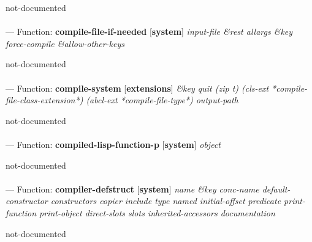 \begin{adjustwidth}{5em}{5em}
not-documented
\end{adjustwidth}

\paragraph{}
\label{SYSTEM:COMPILE-FILE-IF-NEEDED}
--- Function: \textbf{compile-file-if-needed} [\textbf{system}] \textit{input-file \&rest allargs \&key force-compile \&allow-other-keys}

\begin{adjustwidth}{5em}{5em}
not-documented
\end{adjustwidth}

\paragraph{}
\label{EXTENSIONS:COMPILE-SYSTEM}
--- Function: \textbf{compile-system} [\textbf{extensions}] \textit{\&key quit (zip t) (cls-ext *compile-file-class-extension*) (abcl-ext *compile-file-type*) output-path}

\begin{adjustwidth}{5em}{5em}
not-documented
\end{adjustwidth}

\paragraph{}
\label{SYSTEM:COMPILED-LISP-FUNCTION-P}
--- Function: \textbf{compiled-lisp-function-p} [\textbf{system}] \textit{object}

\begin{adjustwidth}{5em}{5em}
not-documented
\end{adjustwidth}

\paragraph{}
\label{SYSTEM:COMPILER-DEFSTRUCT}
--- Function: \textbf{compiler-defstruct} [\textbf{system}] \textit{name \&key conc-name default-constructor constructors copier include type named initial-offset predicate print-function print-object direct-slots slots inherited-accessors documentation}

\begin{adjustwidth}{5em}{5em}
not-documented
\end{adjustwidth}

